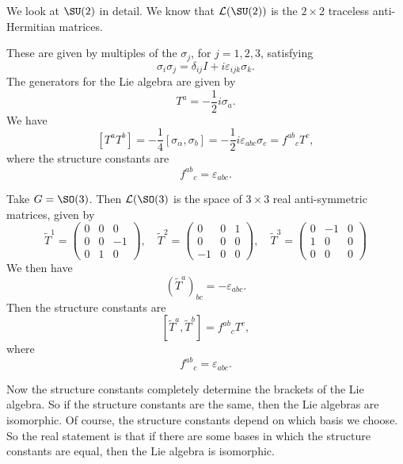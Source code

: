 \documentclass[a4paper]{article}
\begin{document}
\begin{eg}
  We look at $\SU(2)$ in detail. We know that $\mathcal{L}(\SU(2))$ is the $2 \times 2$ traceless anti-Hermitian matrices.

  These are given by multiples of the  $\sigma_j$, for $j = 1, 2, 3$, satisfying
  \[
    \sigma_i \sigma_j = \delta_{ij}I + i \varepsilon_{ijk} \sigma_k.
  \]
  The generators for the Lie algebra are given by
  \[
    T^a = -\frac{1}{2} i \sigma_a.
  \]
  We have
  \[
    [T^a T^b] = -\frac{1}{4}[\sigma_\alpha, \sigma_b] = -\frac{1}{2} i \varepsilon_{abc} \sigma_c = f^{ab}\!_c T^c,
  \]
  where the structure constants are
  \[
    f^{ab}\!_c = \varepsilon_{abc}.
  \]
\end{eg}

\begin{eg}
  Take $G = \SO(3)$. Then $\mathcal{L}(\SO(3)$ is the space of $3 \times 3$ real anti-symmetric matrices, given by
  \[
    \tilde{T}^1 =
    \begin{pmatrix}
      0 & 0 & 0\\
      0 & 0 & -1\\
      0 & 1 & 0
    \end{pmatrix},\quad
    \tilde{T}^2 =
    \begin{pmatrix}
      0 & 0 & 1\\
      0 & 0 & 0\\
      -1 & 0 & 0
    \end{pmatrix},\quad
    \tilde{T}^3 =
    \begin{pmatrix}
      0 & -1 & 0\\
      1 & 0 & 0\\
      0 & 0 & 0
    \end{pmatrix}
  \]
  We then have
  \[
    (\tilde{T}^a)_{bc} = -\varepsilon_{abc}.
  \]
  Then the structure constants are
  \[
    [\tilde{T}^a, \tilde{T}^b] = f^{ab}\!_c T^c,
  \]
  where
  \[
    f^{ab}\!_{c} = \varepsilon_{abc}.
  \]
\end{eg}
Now the structure constants completely determine the brackets of the Lie algebra. So if the structure constants are the same, then the Lie algebras are isomorphic. Of course, the structure constants depend on which basis we choose. So the real statement is that if there are some bases in which the structure constants are equal, then the Lie algebra is isomorphic.
\end{document}
